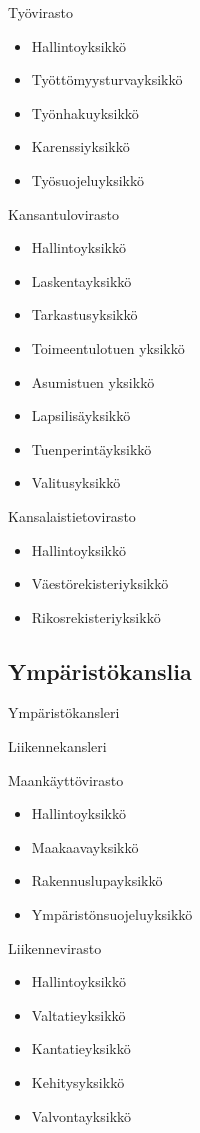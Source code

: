 \documentclass{article}
\begin{document}
	Työvirasto
	\begin{itemize}
		\item Hallintoyksikkö
		\item Työttömyysturvayksikkö
		\item Työnhakuyksikkö
		\item Karenssiyksikkö
		\item Työsuojeluyksikkö
	\end{itemize}

	\vspace{12pt}
	
	Kansantulovirasto
	\begin{itemize}
		\item Hallintoyksikkö
		\item Laskentayksikkö
		\item Tarkastusyksikkö
		\item Toimeentulotuen yksikkö
		\item Asumistuen yksikkö
		\item Lapsilisäyksikkö
		\item Tuenperintäyksikkö
		\item Valitusyksikkö
	\end{itemize}

	\vspace{12pt}
	
	Kansalaistietovirasto
	\begin{itemize}
		\item Hallintoyksikkö
		\item Väestörekisteriyksikkö
		\item Rikosrekisteriyksikkö
	\end{itemize}

	\subsection{Ympäristökanslia}
	Ympäristökansleri
	
	\vspace{12pt}
	
	Liikennekansleri
	
	\vspace{12pt}
	
	Maankäyttövirasto
	\begin{itemize}
		\item Hallintoyksikkö
		\item Maakaavayksikkö
		\item Rakennuslupayksikkö
		\item Ympäristönsuojeluyksikkö
	\end{itemize}

	\vspace{12pt}
	
	Liikennevirasto
	\begin{itemize}
		\item Hallintoyksikkö
		\item Valtatieyksikkö
		\item Kantatieyksikkö
		\item Kehitysyksikkö
		\item Valvontayksikkö
	\end{itemize}
\end{document}
